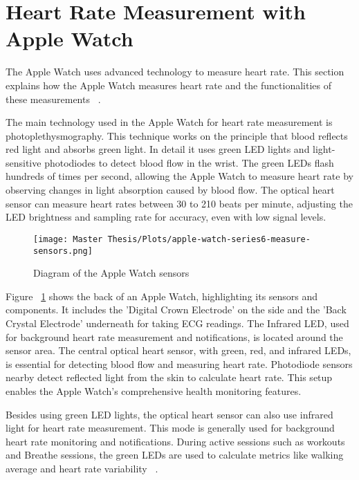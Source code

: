 \section{Heart Rate Measurement with Apple Watch}

The Apple Watch uses advanced technology to measure heart rate. This section explains how the Apple Watch measures heart rate and the functionalities of these measurements ~\cite{AppleSupport120277}.

The main technology used in the Apple Watch for heart rate measurement is photoplethysmography. This technique works on the principle that blood reflects red light and absorbs green light. In detail it uses green LED lights and light-sensitive photodiodes to detect blood flow in the wrist. The green LEDs flash hundreds of times per second, allowing the Apple Watch to measure heart rate by observing changes in light absorption caused by blood flow. The optical heart sensor can measure heart rates between 30 to 210 beats per minute, adjusting the LED brightness and sampling rate for accuracy, even with low signal levels.

\FloatBarrier
\begin{figure}[h!]
\centering
\texttt{[image: Master Thesis/Plots/apple-watch-series6-measure-sensors.png]}
\caption{Diagram of the Apple Watch sensors}
\label{fig:applewatch}
\end{figure}
\FloatBarrier

Figure ~\ref{fig:applewatch} shows the back of an Apple Watch, highlighting its sensors and components. It includes the 'Digital Crown Electrode' on the side and the 'Back Crystal Electrode' underneath for taking ECG readings. The Infrared LED, used for background heart rate measurement and notifications, is located around the sensor area. The central optical heart sensor, with green, red, and infrared LEDs, is essential for detecting blood flow and measuring heart rate. Photodiode sensors nearby detect reflected light from the skin to calculate heart rate. This setup enables the Apple Watch's comprehensive health monitoring features.

Besides using green LED lights, the optical heart sensor can also use infrared light for heart rate measurement. This mode is generally used for background heart rate monitoring and notifications. During active sessions such as workouts and Breathe sessions, the green LEDs are used to calculate metrics like walking average and heart rate variability ~\cite{AppleSupport120277}.

